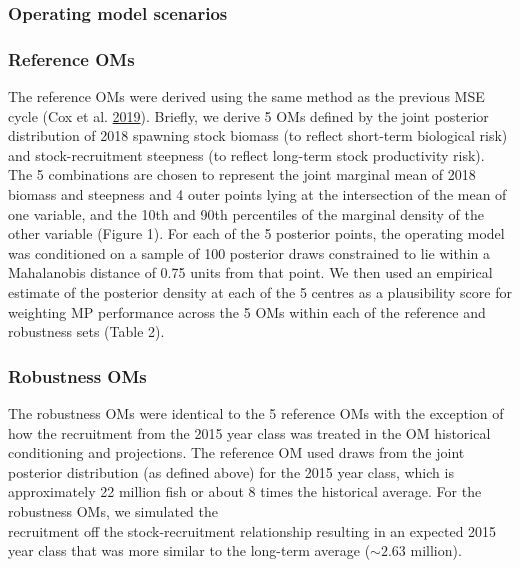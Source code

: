 \documentclass[11pt]{book}
\begin{document}
\hypertarget{operating-model-scenarios}{%
\subsubsection{Operating model scenarios}\label{operating-model-scenarios}}

\hypertarget{reference-oms}{%
\subsubsection{Reference OMs}\label{reference-oms}}

The reference OMs were derived using the same method as the previous MSE cycle (Cox et al. \protect\hyperlink{ref-cox2019evaluating}{2019}). Briefly, we derive 5 OMs defined by the joint posterior distribution of 2018 spawning stock biomass (to reflect short-term biological risk) and stock-recruitment steepness (to reflect long-term stock productivity risk). The 5 combinations are chosen to represent the joint marginal mean of 2018 biomass and steepness and 4 outer points lying at the intersection of the mean of one variable, and the 10th and 90th percentiles of the marginal density of the other variable (Figure 1). For each of the 5 posterior points, the operating model was conditioned on a sample of 100 posterior draws constrained to lie within a Mahalanobis distance of 0.75 units from that point. We then used an empirical estimate of the posterior density at each of the 5 centres as a plausibility score for weighting MP performance across the 5 OMs within each of the reference and robustness sets (Table 2).

\hypertarget{robustness-oms}{%
\subsubsection{Robustness OMs}\label{robustness-oms}}

The robustness OMs were identical to the 5 reference OMs with the exception of how the recruitment from the 2015 year class was treated in the OM historical conditioning and projections. The reference OM used draws from the joint posterior distribution (as defined above) for the 2015 year class, which is approximately 22 million fish or about 8 times the historical average. For the robustness OMs, we simulated the\\
recruitment off the stock-recruitment relationship resulting in an expected 2015 year class that was more similar to the long-term average (\(\sim 2.63\) million).
\end{document}

